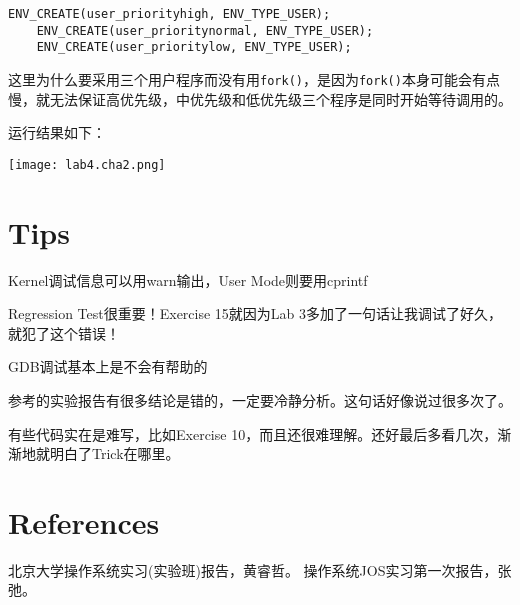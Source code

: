 \documentclass[11pt]{article}
\newenvironment{packed_enum}{
\begin{enumerate}
  \setlength{\itemsep}{1pt}
  \setlength{\parskip}{0pt}
  \setlength{\parsep}{0pt}
}{\end{enumerate}}
\begin{document}
\begin{lstlisting}[title=kern/init.c]
	ENV_CREATE(user_priorityhigh, ENV_TYPE_USER);
	ENV_CREATE(user_prioritynormal, ENV_TYPE_USER);
	ENV_CREATE(user_prioritylow, ENV_TYPE_USER);
\end{lstlisting}
这里为什么要采用三个用户程序而没有用\lstinline|fork()|，是因为\lstinline|fork()|本身可能会有点慢，就无法保证高优先级，中优先级和低优先级三个程序是同时开始等待调用的。

运行结果如下：
\begin{center}
\texttt{[image: lab4.cha2.png]}
\end{center}

\section{Tips}
\begin{packed_enum}
\item Kernel调试信息可以用warn输出，User Mode则要用cprintf
\item Regression Test很重要！Exercise 15就因为Lab 3多加了一句话让我调试了好久，就犯了这个错误！
\item GDB调试基本上是不会有帮助的
\item 参考的实验报告有很多结论是错的，一定要冷静分析。这句话好像说过很多次了。
\item 有些代码实在是难写，比如Exercise 10，而且还很难理解。还好最后多看几次，渐渐地就明白了Trick在哪里。
\end{packed_enum}

\section{References}
北京大学操作系统实习(实验班)报告，黄睿哲。
操作系统JOS实习第一次报告，张弛。
\end{document}
